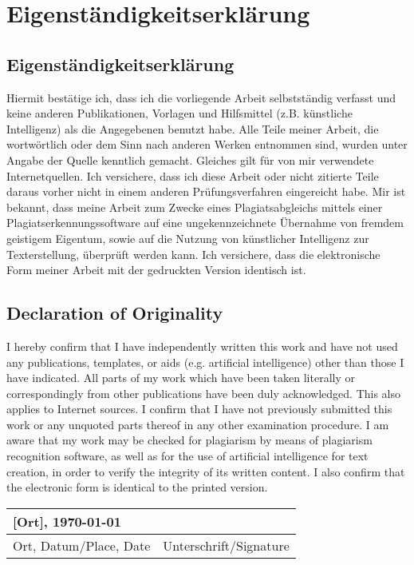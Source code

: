 \chapter{Eigenständigkeitserklärung}

\section*{Eigenständigkeitserklärung}
Hiermit bestätige ich, dass ich die vorliegende Arbeit selbstständig verfasst und keine 
anderen Publikationen, Vorlagen und Hilfsmittel (z.B. künstliche Intelligenz) als die 
Angegebenen benutzt habe. Alle Teile meiner Arbeit, die wortwörtlich oder dem Sinn nach 
anderen Werken entnommen sind, wurden unter Angabe der Quelle kenntlich gemacht. 
Gleiches gilt für von mir verwendete Internetquellen. Ich versichere, dass ich diese Arbeit 
oder nicht zitierte Teile daraus vorher nicht in einem anderen Prüfungsverfahren eingereicht 
habe. Mir ist bekannt, dass meine Arbeit zum Zwecke eines Plagiatsabgleichs mittels einer 
Plagiatserkennungssoftware auf eine ungekennzeichnete Übernahme von fremdem geistigem 
Eigentum, sowie auf die Nutzung von künstlicher Intelligenz zur Texterstellung, überprüft 
werden kann. Ich versichere, dass die elektronische Form meiner Arbeit mit der gedruckten 
Version identisch ist. \\

\section*{Declaration of Originality}
I hereby confirm that I have independently written this work and have not used any 
publications, templates, or aids (e.g. artificial intelligence) other than those I have 
indicated. All parts of my work which have been taken literally or correspondingly from other
publications have been duly acknowledged. This also applies to Internet sources. I confirm
that I have not previously submitted this work or any unquoted parts thereof in any other 
examination procedure. I am aware that my work may be checked for plagiarism by means 
of plagiarism recognition software, as well as for the use of artificial intelligence for text
creation, in order to verify the integrity of its written content. I also confirm that the 
electronic form is identical to the printed version. \\

\vspace{2cm}

\begin{center}
\begin{tabular}{p{}p{}}
    [Ort], \today & \\
    \hline
    Ort, Datum/Place, Date & Unterschrift/Signature \\
\end{tabular}
\end{center}